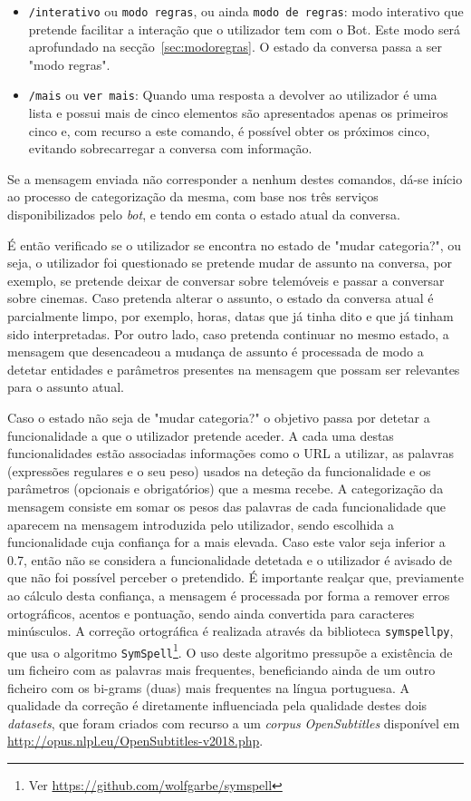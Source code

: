 \documentclass[11pt,a4paper]{article}
\begin{document}
\begin{itemize}
    \item \texttt{/interativo} ou \texttt{modo regras}, ou ainda \texttt{modo de regras}: modo interativo
      que pretende facilitar a interação que o utilizador tem com o Bot. Este modo será aprofundado na
      secção~\ref{sec:modoregras}. O estado da conversa passa a ser "modo regras".
    \item \texttt{/mais} ou \texttt{ver mais}: Quando uma resposta a devolver ao utilizador é uma lista e
      possui mais de cinco elementos são apresentados apenas os primeiros cinco e, com recurso a este comando, é
      possível obter os próximos cinco, evitando sobrecarregar a conversa com informação.
\end{itemize}

Se a mensagem enviada não corresponder a nenhum destes comandos, dá-se início ao processo de categorização
da mesma, com base nos três serviços disponibilizados pelo \textit{bot}, e tendo em conta o estado atual da
conversa.

É então verificado se o utilizador se encontra no estado de "mudar categoria?", ou seja, o utilizador foi
questionado se pretende mudar de assunto na conversa, por exemplo, se pretende deixar de conversar sobre
telemóveis e passar a conversar sobre cinemas. Caso pretenda alterar o assunto, o estado da conversa atual
é parcialmente limpo, por exemplo, horas, datas que já tinha dito e que já tinham sido interpretadas. Por
outro lado, caso pretenda continuar no mesmo estado, a mensagem que desencadeou a mudança de assunto é
processada de modo a detetar entidades e parâmetros presentes na mensagem que possam ser relevantes para
o assunto atual.

Caso o estado não seja de "mudar categoria?" o objetivo passa por detetar a funcionalidade a que o
utilizador pretende aceder. A cada uma destas funcionalidades estão associadas informações como o URL a
utilizar, as palavras (expressões regulares e o seu peso) usados na deteção da funcionalidade e os parâmetros
(opcionais e obrigatórios) que a mesma recebe. A categorização da mensagem consiste em somar os pesos das
palavras de cada funcionalidade que aparecem na mensagem introduzida pelo utilizador, sendo escolhida a
funcionalidade cuja confiança for a mais elevada. Caso este valor seja inferior a 0.7, então não se
considera a funcionalidade detetada e o utilizador é avisado de que não foi possível perceber o pretendido. É
importante realçar que, previamente ao cálculo desta confiança, a mensagem é processada por forma a remover
erros ortográficos, acentos e pontuação, sendo ainda convertida para caracteres minúsculos. A correção
ortográfica é realizada através da biblioteca \texttt{symspellpy}, que usa o algoritmo \texttt{SymSpell}\footnote{Ver \url{https://github.com/wolfgarbe/symspell}}. O uso deste algoritmo pressupõe a existência de
um ficheiro com as palavras mais frequentes, beneficiando ainda de um outro ficheiro com os bi-grams (duas)
mais frequentes na língua portuguesa. A qualidade da correção é diretamente influenciada pela qualidade
destes dois \textit{datasets}, que foram criados com recurso a um \textit{corpus} \textit{OpenSubtitles}
disponível em \url{http://opus.nlpl.eu/OpenSubtitles-v2018.php}.
\end{document}

